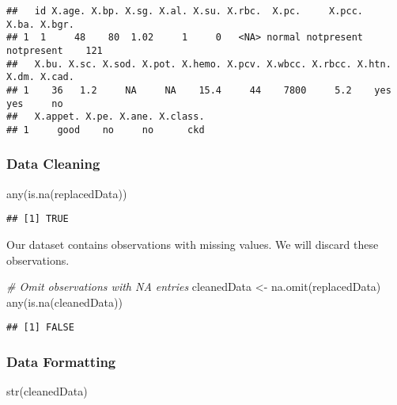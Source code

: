 \documentclass[
]{article}
\newenvironment{Shaded}{\begin{snugshade}}{\end{snugshade}}
\newcommand{\CommentTok}[1]{\textcolor[rgb]{0.56,0.35,0.01}{\textit{#1}}}
\newcommand{\FunctionTok}[1]{\textcolor[rgb]{0.00,0.00,0.00}{#1}}
\newcommand{\NormalTok}[1]{#1}
\newcommand{\OtherTok}[1]{\textcolor[rgb]{0.56,0.35,0.01}{#1}}
\begin{document}
\begin{verbatim}
##   id X.age. X.bp. X.sg. X.al. X.su. X.rbc.  X.pc.     X.pcc.      X.ba. X.bgr.
## 1  1     48    80  1.02     1     0   <NA> normal notpresent notpresent    121
##   X.bu. X.sc. X.sod. X.pot. X.hemo. X.pcv. X.wbcc. X.rbcc. X.htn. X.dm. X.cad.
## 1    36   1.2     NA     NA    15.4     44    7800     5.2    yes   yes     no
##   X.appet. X.pe. X.ane. X.class.
## 1     good    no     no      ckd
\end{verbatim}

\hypertarget{data-cleaning}{%
\subsubsection{Data Cleaning}\label{data-cleaning}}

\begin{Shaded}
\begin{Highlighting}[]
\FunctionTok{any}\NormalTok{(}\FunctionTok{is.na}\NormalTok{(replacedData))}
\end{Highlighting}
\end{Shaded}

\begin{verbatim}
## [1] TRUE
\end{verbatim}

Our dataset contains observations with missing values. We will discard
these observations.

\begin{Shaded}
\begin{Highlighting}[]
\CommentTok{\# Omit observations with NA entries}
\NormalTok{cleanedData }\OtherTok{\textless{}{-}} \FunctionTok{na.omit}\NormalTok{(replacedData)}
\FunctionTok{any}\NormalTok{(}\FunctionTok{is.na}\NormalTok{(cleanedData))}
\end{Highlighting}
\end{Shaded}

\begin{verbatim}
## [1] FALSE
\end{verbatim}

\hypertarget{data-formatting}{%
\subsubsection{Data Formatting}\label{data-formatting}}

\begin{Shaded}
\begin{Highlighting}[]
\FunctionTok{str}\NormalTok{(cleanedData)}
\end{Highlighting}
\end{Shaded}
\end{document}
